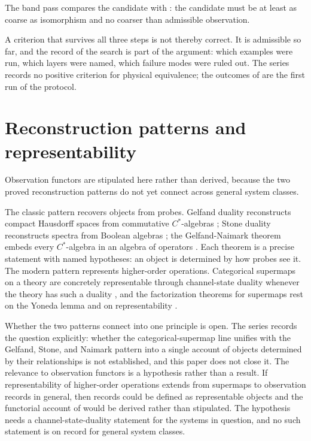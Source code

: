 \documentclass[11pt,letterpaper]{article}
\theoremstyle{definition}
\theoremstyle{remark}
\begin{document}
The band pass compares the candidate with : the candidate must be at least as coarse as isomorphism and no coarser than admissible observation.

A criterion that survives all three steps is not thereby correct. It is admissible so far, and the record of the search is part of the argument: which examples were run, which layers were named, which failure modes were ruled out. The series records no positive criterion for physical equivalence; the outcomes of  are the first run of the protocol.

\section{Reconstruction patterns and representability}
\label{sec:recon}

Observation functors are stipulated here rather than derived, because the two proved reconstruction patterns do not yet connect across general system classes.

The classic pattern recovers objects from probes. Gelfand duality reconstructs compact Hausdorff spaces from commutative $C^*$-algebras \cite{b3}; Stone duality reconstructs spectra from Boolean algebras \cite{b6}; the Gelfand-Naimark theorem embeds every $C^*$-algebra in an algebra of operators \cite{b4}. Each theorem is a precise statement with named hypotheses: an object is determined by how probes see it. The modern pattern represents higher-order operations. Categorical supermaps on a theory are concretely representable through channel-state duality whenever the theory has such a duality \cite{b5,b9}, and the factorization theorems for supermaps rest on the Yoneda lemma and on representability \cite{b5}.

Whether the two patterns connect into one principle is open. The series records the question explicitly: whether the categorical-supermap line unifies with the Gelfand, Stone, and Naimark pattern into a single account of objects determined by their relationships is not established, and this paper does not close it. The relevance to observation functors is a hypothesis rather than a result. If representability of higher-order operations extends from supermaps to observation records in general, then records could be defined as representable objects and the functorial account of  would be derived rather than stipulated. The hypothesis needs a channel-state-duality statement for the systems in question, and no such statement is on record for general system classes.
\end{document}
